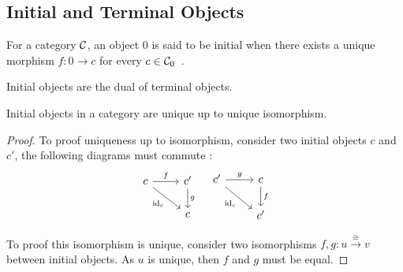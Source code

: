 \subsection{Initial and Terminal Objects}

\begin{definition}
  For a category $\mathcal{C}$, an object $0$ is said to be initial when there exists a
  unique morphism $f: 0\to c$ for every $c\in
  \mathcal{C}_0$~\parencite{awodey:category_theory}.
\end{definition}

\begin{remark}
  Initial objects are the dual of terminal objects.
\end{remark}

\begin{theorem}
  Initial objects in a category are unique up to unique isomorphism.

  \begin{proof}
    To proof uniqueness up to isomorphism, consider two initial objects $c$ and $c'$, the following diagrams must
    commute :
    \[\begin{tikzcd}[ampersand replacement=\&]
      c \& {c'} \\
      \& c
      \arrow["{\id_c}"', from=1-1, to=2-2]
      \arrow["f", from=1-1, to=1-2]
      \arrow["g", from=1-2, to=2-2]
    \end{tikzcd}
    \quad
    \begin{tikzcd}[ampersand replacement=\&]
      {c'} \& c \\
      \& {c'}
      \arrow["{\id_c}"', from=1-1, to=2-2]
      \arrow["g", from=1-1, to=1-2]
      \arrow["f", from=1-2, to=2-2]
    \end{tikzcd}\]

    To proof this isomorphism is unique, consider two isomorphisms $f, g:
    u\overset{\cong}{\to}v$ between initial objects. As $u$ is unique, then $f$
    and $g$ must be equal.
  \end{proof}
\end{theorem}

